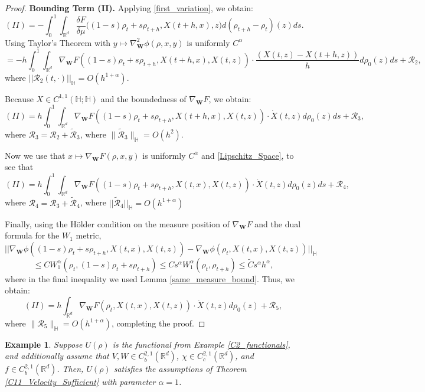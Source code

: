\documentclass[11pt,a4paper]{amsart}
\newcommand{\1}{\mathds{1}}
\newtheorem{example}[theorem]{\textbf{Example}}
\numberwithin{equation}{section}
\begin{document}
\begin{proof}
\textbf{Bounding Term (II).} Applying \eqref{first_variation}, we obtain:
\[
(II) = -\int_0^1 \int_{\mathbb{R}^d} \frac{\delta F}{\delta \mu}\bigl( (1-s) \rho_t + s\rho_{t+h},X(t+h,x),z \bigr) d(\rho_{t+h} - \rho_t)(z) ds.
\]
Using Taylor's Theorem with $y \mapsto \nabla^2_{\mathbf{W}} \phi(\rho,x,y)$ is uniformly $C^{\alpha}$
\[
= -h\int_0^1 \int_{\mathbb{R}^d} \nabla_{\mathbf{W}} F( (1-s)\rho_t+s\rho_{t+h},X(t+h,x),X(t,z)) \cdot \frac{(X(t,z)-X(t+h,z))}{h} d\rho_0(z)ds + \mathcal{R}_2,
\] where $||\mathcal{R}_2(t,\cdot)||_{\mathbb{H}} = O(h^{1+\alpha})$. \smallskip

Because $X \in C^{1,1}(\mathbb{H};\mathbb{H})$ and the boundedness of $\nabla_{\mathbf{W}} F$, we obtain:
\[
(II) = h\int_0^1 \int_{\mathbb{R}^d} \nabla_{\mathbf{W}} F( (1-s)\rho_t + s\rho_{t+h},X(t+h,x),X(t,z)) \cdot \dot{X}(t,z) d\rho_0(z) ds + \mathcal{R}_3,
\]
where $\mathcal{R}_3 = \mathcal{R}_2 + \tilde{\mathcal{R}}_3$, where  $\|\tilde{\mathcal{R}}_3\|_{\mathbb{H}} = O(h^2)$. \smallskip

Now we use that $x \mapsto \nabla_{\mathbf{W}} F(\rho,x,y)$ is uniformly $C^{\alpha}$ and \eqref{Lipschitz_Space}, to see that
\[
(II) = h\int_0^1 \int_{\mathbb{R}^d} \nabla_{\mathbf{W}} F( (1-s)\rho_t + s\rho_{t+h},X(t,x),X(t,z)) \cdot \dot{X}(t,z) d\rho_0(z) ds + \mathcal{R}_4,
\] where  $\mathcal{R}_4 = \mathcal{R}_3 + \tilde{\mathcal{R}}_4$, where $||\tilde{\mathcal{R}}_4||_{\mathbb{H}}= O(h^{1+\alpha})$ \smallskip

Finally, using the Hölder condition on the measure position of $\nabla_{\mathbf{W}} F$ and the dual formula for the $ W_1 $ metric,
\[ ||\nabla_{\mathbf{W}} \phi( (1-s)\rho_t + s\rho_{t+h}, X(t,x),X(t,z)) - 
 \nabla_{\mathbf{W}} \phi( \rho_t, X(t,x),X(t,z))||_{\mathbb{H}} \] \[ \leq 
CW^{\alpha}_1(\rho_t, (1-s)\rho_t + s\rho_{t+h} ) 
 \leq Cs^{\alpha} W^{\alpha}_1(\rho_t,\rho_{t+h}) \leq \tilde{C}s^{\alpha} h^{\alpha},
\] where in the final inequality we used Lemma \ref{same_measure_bound}.
Thus, we obtain:
\[
(II) = h  \int_{\mathbb{R}^d} \nabla_{\mathbf{W}} F(\rho_t,X(t,x),X(t,z)) \cdot \dot{X}(t,z) d\rho_0(z) + \mathcal{R}_5,
\]
where $\|\mathcal{R}_5\|_{\mathbb{H}} = O(h^{1+\alpha})$, completing the proof.
\end{proof}

\begin{example} 
 Suppose $U(\rho)$ is the functional from Example \ref{C2_functionals}, and additionally assume that $V, W \in C^{2,1}_b(\mathbb{R}^d)$, $\chi \in C^{2,1}_c(\mathbb{R}^d)$, and $f \in C^{2,1}_b(\mathbb{R}^d)$. Then, $U(\rho)$ satisfies the assumptions of Theorem \ref{C11_Velocity_Sufficient} with parameter $\alpha=1$. \label{C2alpha_velocity}
\end{example}
\end{document}
